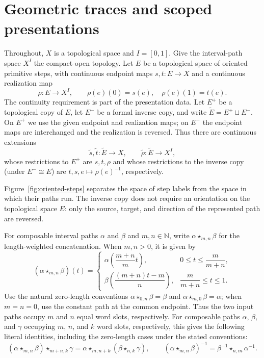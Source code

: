 \documentclass[10pt,reqno]{amsart}
\theoremstyle{definition}
\theoremstyle{plain}
\theoremstyle{remark}
\newcommand{\N}{\mathbb N}
\begin{document}
\section{Geometric traces and scoped presentations}
\label{sec:traces}

Throughout, $X$ is a topological space and $I=[0,1]$.  Give the interval-path
space $X^I$ the compact-open topology.  Let $E$ be a topological space of
oriented primitive steps, with continuous endpoint maps $s,t:E\to X$ and a
continuous realization map
\[
  \rho:E\longrightarrow X^I,
  \qquad \rho(e)(0)=s(e),\quad \rho(e)(1)=t(e).
\]
The continuity requirement is part of the presentation data.  Let $E^+$ be a
topological copy of $E$, let $E^-$ be a formal inverse copy, and write
\(\widetilde E=E^+\sqcup E^-\).  On $E^+$ we use the given endpoint and
realization maps; on $E^-$ the endpoint maps are interchanged and the
realization is reversed.  Thus there are continuous extensions
\[
  \widetilde s,\widetilde t:\widetilde E\longrightarrow X,
  \qquad
  \widetilde\rho:\widetilde E\longrightarrow X^I,
\]
whose restrictions to $E^+$ are $s,t,\rho$ and whose restrictions to the
inverse copy (under $E^-\cong E$) are $t,s,e\mapsto\rho(e)^{-1}$,
respectively.

Figure~\ref{fig:oriented-steps} separates the space of step labels from the
space in which their paths run.  The inverse copy does not require an
orientation on the topological space $E$: only the source, target, and
direction of the represented path are reversed.


For composable interval paths $\alpha$ and $\beta$ and $m,n\in\N$, write
$\alpha\star_{m,n}\beta$ for the length-weighted concatenation.  When
$m,n>0$, it is given by
\[
 (\alpha\star_{m,n}\beta)(t)=
 \begin{cases}
   \alpha\!\left(\dfrac{m+n}{m}t\right),
     &0\leq t\leq\dfrac{m}{m+n},\\[7pt]
   \beta\!\left(\dfrac{(m+n)t-m}{n}\right),
     &\dfrac{m}{m+n}\leq t\leq 1.
 \end{cases}
\]
Use the natural zero-length conventions
$\alpha\star_{0,n}\beta=\beta$ and
$\alpha\star_{m,0}\beta=\alpha$; when $m=n=0$, use the constant path at
the common endpoint.  Thus the two input paths occupy $m$ and $n$ equal
word slots, respectively.  For composable paths $\alpha$, $\beta$, and
$\gamma$ occupying $m$, $n$, and $k$ word slots, respectively, this gives the
following literal identities, including the zero-length cases under the stated
conventions:
\[
 (\alpha\star_{m,n}\beta)\star_{m+n,k}\gamma
 =\alpha\star_{m,n+k}(\beta\star_{n,k}\gamma),
 \qquad
 (\alpha\star_{m,n}\beta)^{-1}
 =\beta^{-1}\star_{n,m}\alpha^{-1}.
\]
\end{document}
